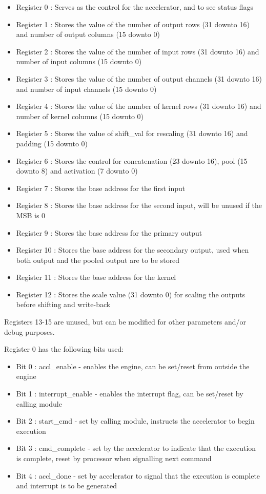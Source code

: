 \documentclass[a4paper,12pt, final]{report}
\begin{document}
\begin{itemize}
	\item Register 0 : Serves as the control for the accelerator, and to see status flags
	\item Register 1 : Stores the value of the number of output rows (31 downto 16) and number of output columns (15 downto 0)
	\item Register 2 : Stores the value of the number of input rows (31 downto 16) and number of input columns (15 downto 0)
	\item Register 3 : Stores the value of the number of output channels (31 downto 16) and number of input channels (15 downto 0)
	\item Register 4 : Stores the value of the number of kernel rows (31 downto 16) and number of kernel columns (15 downto 0)
	\item Register 5 : Stores the value of shift\_val for rescaling (31 downto 16) and padding (15 downto 0)
	\item Register 6 : Stores the control for concatenation (23 downto 16), pool (15 downto 8) and activation (7 downto 0)
	\item Register 7 : Stores the base address for the first input
	\item Register 8 : Stores the base address for the second input, will be unused if the MSB is 0
	\item Register 9 : Stores the base address for the primary output
	\item Register 10 : Stores the base address for the secondary output, used when both output and the pooled output are to be stored
	\item Register 11 : Stores the base address for the kernel
	\item Register 12 : Stores the scale value (31 downto 0) for scaling the outputs before shifting and write-back
\end{itemize}

Registers 13-15 are unused, but can be modified for other parameters and/or debug purposes.

Register 0 has the following bits used:
\begin{itemize}
	\item Bit 0 : accl\_enable - enables the engine, can be set/reset from outside the engine
	\item Bit 1 : interrupt\_enable - enables the interrupt flag,  can be set/reset by calling module
	\item Bit 2 : start\_cmd - set by calling module, instructs the accelerator to begin execution
	\item Bit 3 : cmd\_complete - set by the accelerator to indicate that the execution is complete, reset by processor when signalling next command
	\item Bit 4 : accl\_done - set by accelerator to signal that the execution is complete and interrupt is to be generated
\end{itemize}
\end{document}

